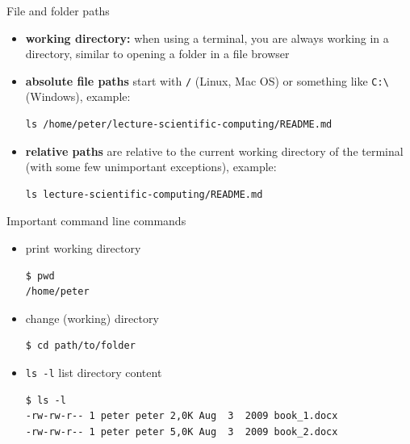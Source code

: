 \begin{frame}[fragile]{File and folder paths}
    \begin{itemize}
        \item {\bf working directory:} when using a terminal, you are always working in a
            directory, similar to opening a folder in a file browser\pause
        \item {\bf absolute file paths} start with \verb|/| (Linux, Mac OS) or something like \verb|C:\|
            (Windows), example:
            {\small
            \begin{verbatim}ls /home/peter/lecture-scientific-computing/README.md\end{verbatim}}\pause
        \item {\bf relative paths} are relative to the current working directory of the terminal (with some few unimportant exceptions), example:
            {\small
            \begin{verbatim}ls lecture-scientific-computing/README.md\end{verbatim}}
    \end{itemize}

\end{frame}

\begin{frame}[fragile]{Important command line commands}
    \begin{itemize}
        \item print working directory
\begin{verbatim}$ pwd
/home/peter
\end{verbatim}\pause
        \item change (working) directory
\begin{verbatim}$ cd path/to/folder\end{verbatim}\pause
        \item \verb|ls -l| list directory content
\begin{verbatim}$ ls -l
-rw-rw-r-- 1 peter peter 2,0K Aug  3  2009 book_1.docx
-rw-rw-r-- 1 peter peter 5,0K Aug  3  2009 book_2.docx
\end{verbatim}
    \end{itemize}
\end{frame}


